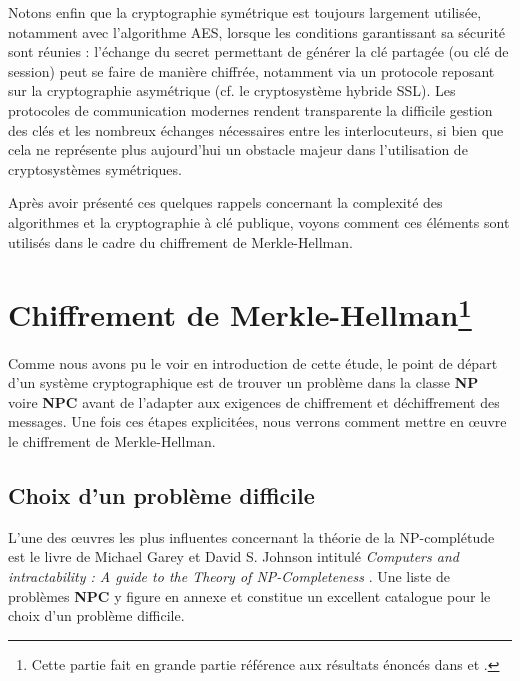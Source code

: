 \documentclass[a4paper,10pt]{article}
\begin{document}
Notons enfin que la cryptographie symétrique est toujours largement utilisée, notamment avec l'algorithme AES, lorsque les conditions garantissant sa sécurité sont réunies : l'échange du secret permettant de générer la clé partagée (ou clé de session) peut se faire de manière chiffrée, notamment via un protocole reposant sur la cryptographie asymétrique (cf. le cryptosystème hybride SSL). Les protocoles de communication modernes rendent transparente la difficile gestion des clés et les nombreux échanges nécessaires entre les interlocuteurs, si bien que cela ne représente plus aujourd'hui un obstacle majeur dans l'utilisation de cryptosystèmes symétriques.

Après avoir présenté ces quelques rappels concernant la complexité des algorithmes et la cryptographie à clé publique, voyons comment ces éléments sont utilisés dans le cadre du chiffrement de Merkle-Hellman.



\section[Chiffrement de Merkle-Hellman]{Chiffrement de Merkle-Hellman\protect\footnote{Cette partie fait en grande partie référence aux résultats énoncés dans \cite{MARTIN2004} et \cite{stinson1996}.}}

Comme nous avons pu le voir en introduction de cette étude, le point de départ d'un système cryptographique est de trouver un problème dans la classe \textbf{NP} voire \textbf{NPC} avant de l'adapter aux exigences de chiffrement et déchiffrement des messages. Une fois ces étapes explicitées, nous verrons comment mettre en œuvre le chiffrement de Merkle-Hellman.



\subsection{Choix d'un problème difficile}
\label{problem}

L'une des œuvres les plus influentes concernant la théorie de la NP-complétude est le livre de Michael Garey et David S. Johnson intitulé \textit{Computers and intractability : A guide to the Theory of NP-Completeness} \cite{GJ1979}. Une liste de problèmes \textbf{NPC} y figure en annexe et constitue un excellent catalogue pour le choix d'un problème difficile.
\end{document}
